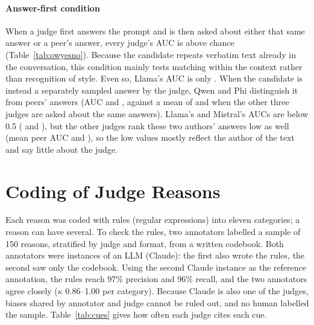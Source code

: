 \paragraph{Answer-first condition}
When a judge first answers the prompt and is then asked about either that same
answer or a peer's answer, every judge's AUC is above chance
(Table~\ref{tab:owyesno}). Because the candidate repeats verbatim text already in
the conversation, this condition mainly tests matching within the context
rather than recognition of style. Even so, Llama's AUC is only
\OWLlamaOnPolAUC{}. When the candidate is instead a separately sampled answer
by the judge, Qwen and Phi distinguish it from peers' answers (AUC
\OWQwenOnPolResAUC{} and \OWPhiOnPolResAUC{}, against a mean of
\CXPeerAUCQwen{} and \CXPeerAUCPhi{} when the other three judges are asked
about the same answers). Llama's and Mistral's AUCs are below 0.5
(\OWLlamaOnPolResAUC{} and \OWMistralOnPolResAUC{}), but the other judges rank
these two authors' answers low as well (mean peer AUC \CXPeerAUCLlama{} and
\CXPeerAUCMistral{}), so the low values mostly reflect the author of the text
and say little about the judge.






\FloatBarrier
\section{Coding of Judge Reasons}
\label{app:rationales}

Each reason was coded with rules (regular expressions) into eleven
categories; a reason can have several. To check the rules, two annotators
labelled a sample of 150 reasons, stratified by judge and format, from a
written codebook. Both annotators were instances of an LLM (Claude): the
first also wrote the rules, the second saw only the codebook. Using the second
Claude instance as the reference annotation, the rules reach 97\% precision and 96\% recall, and the two
annotators agree closely ($\kappa$ 0.86--1.00 per category). Because Claude is
also one of the judges, biases shared by annotator and judge cannot be ruled
out, and no human labelled the sample. Table~\ref{tab:cues} gives how often
each judge cites each cue.





